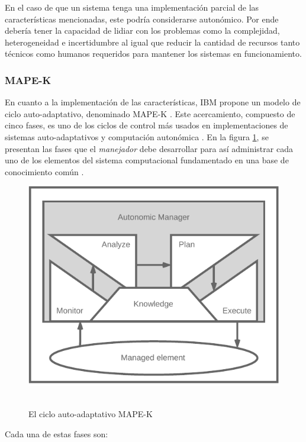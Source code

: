 En el caso de que un sistema tenga una implementación parcial de las características mencionadas, este podría considerarse autonómico. Por ende debería tener la capacidad de lidiar con los problemas como la complejidad, heterogeneidad e incertidumbre \cite{emerging_2005} al igual que reducir la cantidad de recursos tanto técnicos como humanos requeridos para mantener los sistemas en funcionamiento.

\subsubsection{MAPE-K}


En cuanto a la implementación de las características, IBM propone un modelo de ciclo auto-adaptativo, denominado MAPE-K \cite{Krikava2013}. Este acercamiento, compuesto de cinco fases, es uno de los ciclos de control más usados en implementaciones de sistemas auto-adaptativos y computación autonómica \cite{Arcaini_2015}. En la figura \ref{fig:mapek}, se presentan las fases que el \textit{manejador} debe desarrollar para así administrar cada uno de los elementos del sistema computacional fundamentado en una base de conocimiento común \cite{alessandra_2010}. 

\begin{figure}[ht]
    \centering
    \caption{\\El ciclo auto-adaptativo MAPE-K \protect\cite{alessandra_2010}} 
    \includegraphics[width=0.6\linewidth]{images/mape-k.pdf}
    \label{fig:mapek}
\end{figure}

Cada una de estas fases son:


